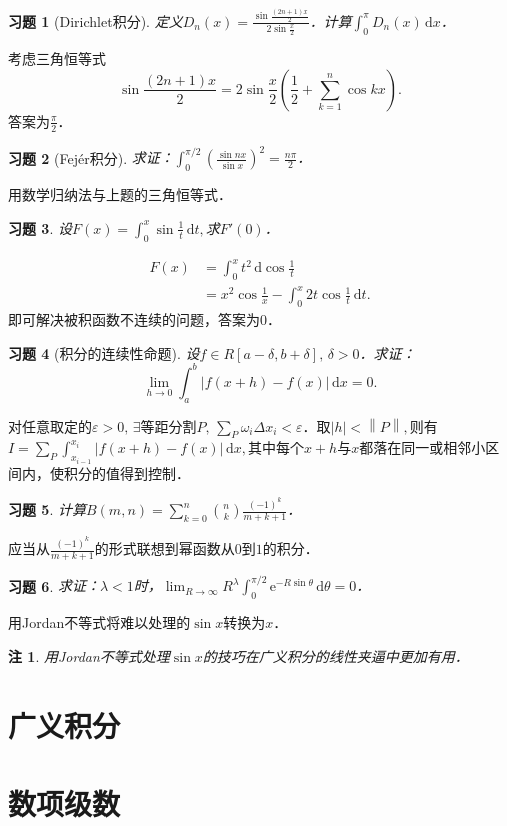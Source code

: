 \documentclass[11pt,a4paper]{ctexart}
\makeatletter
\theoremstyle{thmseries} %
\theoremstyle{exerseries}
\newtheorem{exer}{习题}[section]
\newtheorem*{rem}{注}
\renewenvironment{proof}[1][\proofname]{\par
  \pushQED{\qed}%
  \normalfont \topsep6\p@\@plus6\p@\relax
  \trivlist
  \item[\hskip\labelsep
        \itshape
    #1\@addpunct{}]\ignorespaces
}{%
  \popQED\endtrivlist\@endpefalse
}
\newenvironment{sol}{\begin{proof}[\bfseries\upshape 解\quad]}{\end{proof}}
\newenvironment{pf}{\begin{proof}[\bfseries\upshape 证\quad]}{\end{proof}}
\newcommand{\bra}[1]{\mathopen{}\left(#1\right)}
\renewcommand{\epsilon}{\varepsilon}
\renewcommand{\d}{\mathrm{d}}
\newcommand{\e}{\mathrm{e}}
\newcommand{\norm}[1]{\left\lVert #1 \right\rVert}
\makeatother
\begin{document}
\begin{exer}[Dirichlet积分]
	定义$D_n(x)=\frac{\sin\frac{(2n+1)x}{2}}{2\sin\frac{x}{2}}$．计算$\int_{0}^{\pi}D_n(x)\,\d x$．
\end{exer}
\begin{sol}
	考虑三角恒等式
	\[\sin\frac{(2n+1)x}{2}=2\sin\frac{x}{2}\bra{\frac{1}{2}+\sum_{k=1}^{n}\cos kx}.\]
	答案为$\frac{\pi}{2}$．
\end{sol}

\begin{exer}[Fejér积分]
	求证：$\int_{0}^{\pi/2}\bra{\frac{\sin nx}{\sin x}}^2=\frac{n\pi}{2}$．
\end{exer}
\begin{pf}
	用数学归纳法与上题的三角恒等式．
\end{pf}

\begin{exer}
	设$F(x)=\int_{0}^{x}\sin\frac{1}{t}\,\d t,$求$F'(0)$．
\end{exer}
\begin{sol}
	\begin{align*}
		F(x)&=\int_{0}^{x}t^2\,\d\cos\frac{1}{t}\\
		&=x^2\cos\frac{1}{x}-\int_{0}^{x}2t\cos\frac{1}{t}\,\d t.
	\end{align*}
	即可解决被积函数不连续的问题，答案为$0$．
\end{sol}

\begin{exer}[积分的连续性命题]
	设$f\in R[a-\delta,b+\delta],\,\delta>0$．求证：
	\[\lim_{h\to0}\int_{a}^{b}|f(x+h)-f(x)|\,\d x=0.\]
\end{exer}
\begin{pf}
	对任意取定的$\epsilon>0,\,\exists$等距分割$P,\,\sum_{P}\omega_i\Delta x_i<\epsilon$．取$|h|<\norm{P},$则有
	$I=\sum_{P}\int_{x_{i-1}}^{x_i}|f(x+h)-f(x)|\,\d x,$其中每个$x+h$与$x$都落在同一或相邻小区间内，使积分的值得到控制．
\end{pf}

\begin{exer}
	计算$B(m,n)=\sum_{k=0}^{n}\binom{n}{k}\frac{(-1)^k}{m+k+1}$．
\end{exer}
\begin{sol}
	应当从$\frac{(-1)^k}{m+k+1}$的形式联想到幂函数从$0$到$1$的积分．
\end{sol}

\begin{exer}
	求证：$\lambda<1$时，$\lim_{R\to\infty}R^\lambda\int_{0}^{\pi/2}\e^{-R\sin\theta}\,\d\theta=0$．
\end{exer}
\begin{pf}
	用Jordan不等式将难以处理的$\sin x$转换为$x$．
\end{pf}
\begin{rem}
	用Jordan不等式处理$\sin x$的技巧在广义积分的线性夹逼中更加有用．
\end{rem}



\section{广义积分}


\section{数项级数}
\end{document}
